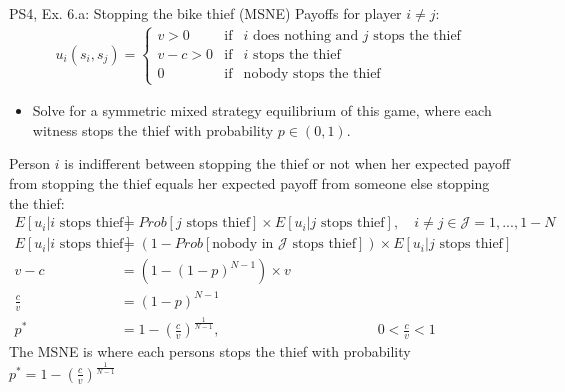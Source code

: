 \begin{frame}{PS4, Ex. 6.a: Stopping the bike thief (MSNE)}
    Payoffs for player $i\neq j$:
    \begin{align*}
      u_i(s_i,s_j)=
      \left\{ \begin{array}{rcl}
      v > 0 & \mbox{if} & \mbox{$i$ does nothing and $j$ stops the thief} \\
      v-c>0 & \mbox{if} & \mbox{$i$ stops the thief} \\
      0     & \mbox{if} & \mbox{nobody stops the thief}
      \end{array}\right.
    \end{align*}
    \vspace{-12pt}
    \begin{itemize}
      \item[a)] Solve for a symmetric mixed strategy equilibrium of this game, where each witness stops the thief with probability $p\in(0,1)$.
    \end{itemize}
    Person $i$ is indifferent between stopping the thief or not when her expected payoff from stopping the thief equals her expected payoff from someone else stopping the thief:
    \begin{align}
        E[u_i|i\text{ stops thief}]&=Prob[j\text{ stops thief}]\times E[u_i|j\text{ stops thief}],\quad i\neq j\in \mathcal{J}=1,...,1-N\nonumber\\
        E[u_i|i\text{ stops thief}]&=\left(1-Prob[\text{nobody in $\mathcal{J}$ stops thief}]\right)\times E[u_i|j\text{ stops thief}]\nonumber\\
        v-c&=\left(1-(1-p)^{N-1}\right)\times v\nonumber\\
        \frac{c}{v}&=(1-p)^{N-1}\label{c over v}\\
        p^{*}&=1-\left(\frac{c}{v}\right)^{\frac{1}{N-1}},
        \quad\quad\quad\quad\quad\quad\quad\quad\quad\quad\quad\ 0<\frac{c}{v}<1\nonumber
    \end{align}
    The MSNE is where each persons stops the thief with probability $p^{*}=1-\left(\frac{c}{v}\right)^{\frac{1}{N-1}}$
  \vfill\null
\end{frame}

